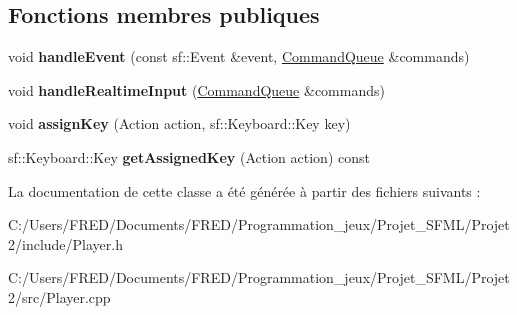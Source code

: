\subsection*{Fonctions membres publiques}
\begin{DoxyCompactItemize}
\item 
void {\bfseries handle\+Event} (const sf\+::\+Event \&event, \hyperlink{class_command_queue}{Command\+Queue} \&commands)\hypertarget{class_player_ac84a4e0b787f92bf773ccd0d0483f5b1}{}\label{class_player_ac84a4e0b787f92bf773ccd0d0483f5b1}

\item 
void {\bfseries handle\+Realtime\+Input} (\hyperlink{class_command_queue}{Command\+Queue} \&commands)\hypertarget{class_player_ac520744c103fb38763c8856b4f158627}{}\label{class_player_ac520744c103fb38763c8856b4f158627}

\item 
void {\bfseries assign\+Key} (Action action, sf\+::\+Keyboard\+::\+Key key)\hypertarget{class_player_ae7a6e190b35182eef75bb2aff219f90c}{}\label{class_player_ae7a6e190b35182eef75bb2aff219f90c}

\item 
sf\+::\+Keyboard\+::\+Key {\bfseries get\+Assigned\+Key} (Action action) const \hypertarget{class_player_a210ce6683e3b945cf8d169a699ed527a}{}\label{class_player_a210ce6683e3b945cf8d169a699ed527a}

\end{DoxyCompactItemize}


La documentation de cette classe a été générée à partir des fichiers suivants \+:\begin{DoxyCompactItemize}
\item 
C\+:/\+Users/\+F\+R\+E\+D/\+Documents/\+F\+R\+E\+D/\+Programmation\+\_\+jeux/\+Projet\+\_\+\+S\+F\+M\+L/\+Projet2/include/Player.\+h\item 
C\+:/\+Users/\+F\+R\+E\+D/\+Documents/\+F\+R\+E\+D/\+Programmation\+\_\+jeux/\+Projet\+\_\+\+S\+F\+M\+L/\+Projet2/src/Player.\+cpp\end{DoxyCompactItemize}
